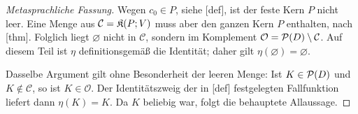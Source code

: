 \documentclass[main.tex]{subfiles}
\begin{document}
\begin{proof}[Metasprachliche Fassung]
Wegen \(c_0\in P\), siehe
[def], ist der feste Kern \(P\)
nicht leer. Eine Menge aus \(\mathcal C=\mathfrak K(P;V)\) muss aber
den ganzen Kern \(P\) enthalten, nach
[thm]. Folglich liegt
\(\varnothing\) nicht in \(\mathcal C\), sondern im Komplement
\(\mathcal O=\mathcal{P}(D)\setminus\mathcal C\). Auf diesem Teil ist
\(\eta\) definitionsgemäß die Identität; daher gilt
\(\eta(\varnothing)=\varnothing\).

Dasselbe Argument gilt ohne Besonderheit der leeren Menge: Ist
\(K\in\mathcal{P}(D)\) und \(K\notin\mathcal C\), so ist
\(K\in\mathcal O\). Der Identitätszweig der in
[def] festgelegten
Fallfunktion liefert dann \(\eta(K)=K\). Da \(K\) beliebig war, folgt
die behauptete Allaussage.
\end{proof}

\MogTableProofHeading
\begin{tabproofwide}
\end{tabproofwide}
\end{document}
